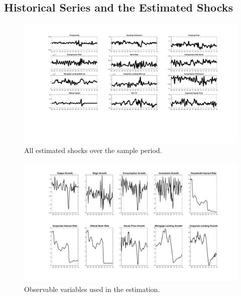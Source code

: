 \documentclass[12pt]{article}
\numberwithin{equation}{section}
\begin{document}
\begin{appendix}

\section{Historical Series and the Estimated Shocks}

\begin{figure}
\centering
\caption{All estimated shocks over the sample period.}
\label{estimated_shocks}
\includegraphics[scale=0.5]{smoothed_shocks.pdf}
\end{figure}


\begin{figure}
\centering
\caption{Observable variables used in the estimation.}
\label{estimated_shocks}
\includegraphics[scale=0.5]{dataset.pdf}
\end{figure}



\end{appendix}
\end{document}
